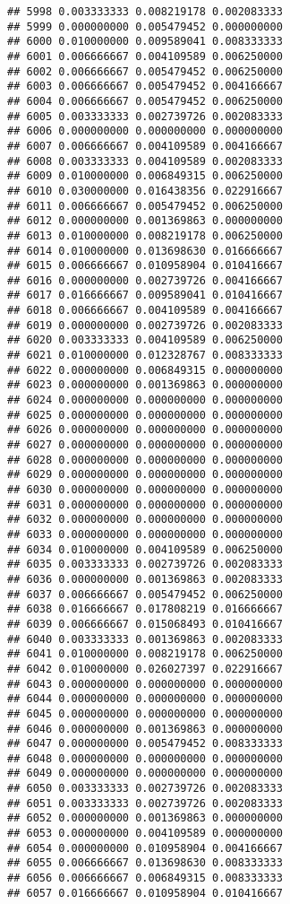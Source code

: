 \documentclass[
]{article}
\begin{document}
\begin{verbatim}
## 5998 0.003333333 0.008219178 0.002083333
## 5999 0.000000000 0.005479452 0.000000000
## 6000 0.010000000 0.009589041 0.008333333
## 6001 0.006666667 0.004109589 0.006250000
## 6002 0.006666667 0.005479452 0.006250000
## 6003 0.006666667 0.005479452 0.004166667
## 6004 0.006666667 0.005479452 0.006250000
## 6005 0.003333333 0.002739726 0.002083333
## 6006 0.000000000 0.000000000 0.000000000
## 6007 0.006666667 0.004109589 0.004166667
## 6008 0.003333333 0.004109589 0.002083333
## 6009 0.010000000 0.006849315 0.006250000
## 6010 0.030000000 0.016438356 0.022916667
## 6011 0.006666667 0.005479452 0.006250000
## 6012 0.000000000 0.001369863 0.000000000
## 6013 0.010000000 0.008219178 0.006250000
## 6014 0.010000000 0.013698630 0.016666667
## 6015 0.006666667 0.010958904 0.010416667
## 6016 0.000000000 0.002739726 0.004166667
## 6017 0.016666667 0.009589041 0.010416667
## 6018 0.006666667 0.004109589 0.004166667
## 6019 0.000000000 0.002739726 0.002083333
## 6020 0.003333333 0.004109589 0.006250000
## 6021 0.010000000 0.012328767 0.008333333
## 6022 0.000000000 0.006849315 0.000000000
## 6023 0.000000000 0.001369863 0.000000000
## 6024 0.000000000 0.000000000 0.000000000
## 6025 0.000000000 0.000000000 0.000000000
## 6026 0.000000000 0.000000000 0.000000000
## 6027 0.000000000 0.000000000 0.000000000
## 6028 0.000000000 0.000000000 0.000000000
## 6029 0.000000000 0.000000000 0.000000000
## 6030 0.000000000 0.000000000 0.000000000
## 6031 0.000000000 0.000000000 0.000000000
## 6032 0.000000000 0.000000000 0.000000000
## 6033 0.000000000 0.000000000 0.000000000
## 6034 0.010000000 0.004109589 0.006250000
## 6035 0.003333333 0.002739726 0.002083333
## 6036 0.000000000 0.001369863 0.002083333
## 6037 0.006666667 0.005479452 0.006250000
## 6038 0.016666667 0.017808219 0.016666667
## 6039 0.006666667 0.015068493 0.010416667
## 6040 0.003333333 0.001369863 0.002083333
## 6041 0.010000000 0.008219178 0.006250000
## 6042 0.010000000 0.026027397 0.022916667
## 6043 0.000000000 0.000000000 0.000000000
## 6044 0.000000000 0.000000000 0.000000000
## 6045 0.000000000 0.000000000 0.000000000
## 6046 0.000000000 0.001369863 0.000000000
## 6047 0.000000000 0.005479452 0.008333333
## 6048 0.000000000 0.000000000 0.000000000
## 6049 0.000000000 0.000000000 0.000000000
## 6050 0.003333333 0.002739726 0.002083333
## 6051 0.003333333 0.002739726 0.002083333
## 6052 0.000000000 0.001369863 0.000000000
## 6053 0.000000000 0.004109589 0.000000000
## 6054 0.000000000 0.010958904 0.004166667
## 6055 0.006666667 0.013698630 0.008333333
## 6056 0.006666667 0.006849315 0.008333333
## 6057 0.016666667 0.010958904 0.010416667

\end{verbatim}
\end{document}
